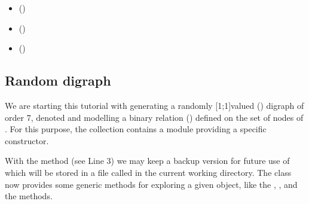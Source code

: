\documentclass[a4paper,10pt,english]{sphinxhowto}
\begin{document}
\begin{sphinxShadowBox}
\begin{itemize}
\item {} 
\label{\detokenize{tutorial:id177}}{\hyperref[\detokenize{tutorial:strong-components}]{}} ()

\item {} 
\label{\detokenize{tutorial:id178}}{\hyperref[\detokenize{tutorial:csv-storage}]{}} ()

\item {} 
\label{\detokenize{tutorial:id179}}{\hyperref[\detokenize{tutorial:complete-empty-and-indeterminate-digraphs}]{}} ()

\end{itemize}
\end{sphinxShadowBox}


\subsection{Random digraph}
\label{\detokenize{tutorial:random-digraph}}
We are starting this tutorial with generating a randomly {[}\sphinxhyphen{}1;1{]}\sphinxhyphen{}valued () digraph of order 7, denoted  and modelling a binary relation () defined on the set of nodes of . For this purpose, the  collection contains a  module providing a specific  constructor.

\begin{sphinxVerbatim}[commandchars=\\\{\},numbers=left,firstnumber=1,stepnumber=1]
\end{sphinxVerbatim}

With the  method (see Line 3) we may keep a backup version for future use of  which will be stored in a file called  in the current working directory. The  class now provides some generic methods for exploring a given  object, like the , ,  and the  methods.
\end{document}
